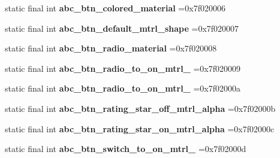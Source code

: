 \begin{DoxyCompactItemize}
\item 
\hypertarget{classcheck_1_1test_1_1_r_1_1drawable_aa158d2ca7dc9ce6096662dbd071c1136}{}static final int {\bfseries abc\+\_\+btn\+\_\+colored\+\_\+material} =0x7f020006\label{classcheck_1_1test_1_1_r_1_1drawable_aa158d2ca7dc9ce6096662dbd071c1136}

\item 
\hypertarget{classcheck_1_1test_1_1_r_1_1drawable_a6632f510130b8b09efd5128dc78ae170}{}static final int {\bfseries abc\+\_\+btn\+\_\+default\+\_\+mtrl\+\_\+shape} =0x7f020007\label{classcheck_1_1test_1_1_r_1_1drawable_a6632f510130b8b09efd5128dc78ae170}

\item 
\hypertarget{classcheck_1_1test_1_1_r_1_1drawable_a26dc88a0963868e4a53ede36b764aded}{}static final int {\bfseries abc\+\_\+btn\+\_\+radio\+\_\+material} =0x7f020008\label{classcheck_1_1test_1_1_r_1_1drawable_a26dc88a0963868e4a53ede36b764aded}

\item 
\hypertarget{classcheck_1_1test_1_1_r_1_1drawable_ab244877d7dd0915802eb5a4a45280d1f}{}static final int {\bfseries abc\+\_\+btn\+\_\+radio\+\_\+to\+\_\+on\+\_\+mtrl\+\_} =0x7f020009\label{classcheck_1_1test_1_1_r_1_1drawable_ab244877d7dd0915802eb5a4a45280d1f}

\item 
\hypertarget{classcheck_1_1test_1_1_r_1_1drawable_af74a7e4cf8bb3fe6528776fac94a0a89}{}static final int {\bfseries abc\+\_\+btn\+\_\+radio\+\_\+to\+\_\+on\+\_\+mtrl\+\_} =0x7f02000a\label{classcheck_1_1test_1_1_r_1_1drawable_af74a7e4cf8bb3fe6528776fac94a0a89}

\item 
\hypertarget{classcheck_1_1test_1_1_r_1_1drawable_adfafa6fea7becba67bbe646d62ba7d3d}{}static final int {\bfseries abc\+\_\+btn\+\_\+rating\+\_\+star\+\_\+off\+\_\+mtrl\+\_\+alpha} =0x7f02000b\label{classcheck_1_1test_1_1_r_1_1drawable_adfafa6fea7becba67bbe646d62ba7d3d}

\item 
\hypertarget{classcheck_1_1test_1_1_r_1_1drawable_abf4ab3ff0bab012fcdc73bfd871cf2ed}{}static final int {\bfseries abc\+\_\+btn\+\_\+rating\+\_\+star\+\_\+on\+\_\+mtrl\+\_\+alpha} =0x7f02000c\label{classcheck_1_1test_1_1_r_1_1drawable_abf4ab3ff0bab012fcdc73bfd871cf2ed}

\item 
\hypertarget{classcheck_1_1test_1_1_r_1_1drawable_a5210b8ccc2464094707e460abe8018be}{}static final int {\bfseries abc\+\_\+btn\+\_\+switch\+\_\+to\+\_\+on\+\_\+mtrl\+\_} =0x7f02000d\label{classcheck_1_1test_1_1_r_1_1drawable_a5210b8ccc2464094707e460abe8018be}


\end{DoxyCompactItemize}
